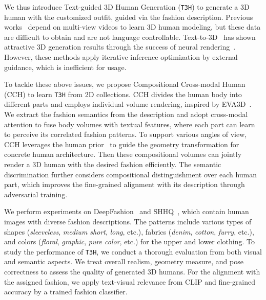 \documentclass[11pt]{article}
\begin{document}
We thus introduce Text-guided 3D Human Generation (\texttt{T3H}) to generate a 3D human with the customized outfit, guided via the fashion description. Previous works~\cite{Kolotouros2019human-recon,gao2022mps-nerf} depend on multi-view videos to learn 3D human modeling, but these data are difficult to obtain and are not language controllable. Text-to-3D~\cite{jain2022dream-field,poole2023dream-fusion} has shown attractive 3D generation results through the success of neural rendering~\cite{mildenhall2020nerf}. However, these methods apply iterative inference optimization by external guidance, which is inefficient for usage.

To tackle these above issues, we propose Compositional Cross-modal Human (CCH) to learn \texttt{T3H} from 2D collections. CCH divides the human body into different parts and employs individual volume rendering, inspired by EVA3D~\cite{hong2023eva3d}. We extract the fashion semantics from the description and adopt cross-modal attention to fuse body volumes with textual features, where each part can learn to perceive its correlated fashion patterns. To support various angles of view, CCH leverages the human prior~\cite{bogo2016smpl} to guide the geometry transformation for concrete human architecture. Then these compositional volumes can jointly render a 3D human with the desired fashion efficiently. The semantic discrimination further considers compositional distinguishment over each human part,  which improves the fine-grained alignment with its description through adversarial training.

We perform experiments on DeepFashion~\cite{liu2016deep-fashion,jiang2022text2human} and SHHQ~\cite{fu2022shhq}, which contain human images with diverse fashion descriptions. The patterns include various types of shapes (\textit{sleeveless}, \textit{medium short}, \textit{long}, etc.), fabrics (\textit{denim}, \textit{cotton}, \textit{furry}, etc.),  and colors (\textit{floral}, \textit{graphic}, \textit{pure color}, etc.) for the upper and lower clothing. To study the performance of \texttt{T3H}, we conduct a thorough evaluation from both visual and semantic aspects. We treat overall realism, geometry measure, and pose correctness to assess the quality of generated 3D humans. For the alignment with the assigned fashion, we apply text-visual relevance from CLIP and fine-grained accuracy by a trained fashion classifier.
\end{document}

